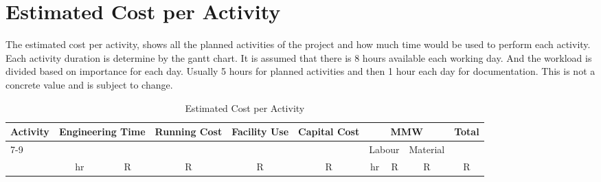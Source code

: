 
\chapter{Estimated Cost per Activity}


The estimated cost per activity, shows all the planned activities of the project and how much time would be used to perform each activity. Each activity duration is determine by the gantt chart. It is assumed that there is 8 hours available each working day. And the workload is divided based on importance for each day. Usually 5 hours for planned activities and then 1 hour each day for documentation. This is not a concrete value and is subject to change.
\begin{landscape} 

\begin{table}[H]
    \centering
    \footnotesize                   
    \setlength{\tabcolsep}{4pt} 
    \caption{Estimated Cost per Activity}    
    \begin{tabular}{|l|c|c|c|c|c|c|c|c|c|}
        \hline

            \multirow{3}{*}{Activity} & 
            \multicolumn{2}{c|}{\multirow{2}{*}{Engineering Time}} & 
            \multirow{2}{*}{Running Cost} & 
            \multirow{2}{*}{Facility Use} & 
            \multirow{2}{*}{Capital Cost} & 
            \multicolumn{3}{c|}{MMW} & 
            \multirow{3}{*}{Total} \\
        \cline{7-9}
            & 
            \multicolumn{2}{c|}{} &     
            &                           
            &                           
            &                           
            \multicolumn{2}{c|}{Labour} & 
            Material & 
            \\
        \hline
            & hr & R & R & R & R & hr & R & R & R \\
        \hline



\end{tabular}
\end{table}
\end{landscape}

